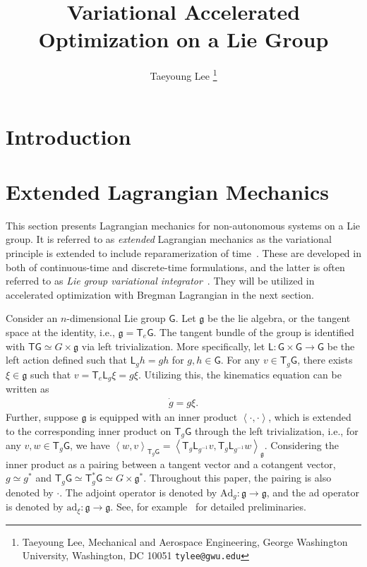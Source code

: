 \documentclass[letterpaper, 10pt, conference]{ieeeconf}
\title{\LARGE \bf Variational Accelerated Optimization on a Lie Group}
\author{Taeyoung Lee%
    \thanks{Taeyoung Lee, Mechanical and Aerospace Engineering, George Washington University, Washington, DC 10051 {\tt tylee@gwu.edu}}%
}
\newcommand{\G}{\ensuremath{\mathsf{G}}}
\newcommand{\T}{\ensuremath{\mathsf{T}}}
\renewcommand{\L}{\ensuremath{\mathsf{L}}}
\newcommand{\pair}[1]{\ensuremath{\left\langle #1 \right\rangle}}
\newcommand{\Ad}{\ensuremath{\mathrm{Ad}}}
\newcommand{\ad}{\ensuremath{\mathrm{ad}}}
\newcommand{\g}{\ensuremath{\mathfrak{g}}}
\begin{document}
\allowdisplaybreaks


\maketitle \thispagestyle{empty} \pagestyle{empty}

\begin{abstract}
\end{abstract}

\section{Introduction}

\section{Extended Lagrangian Mechanics}

This section presents Lagrangian mechanics for non-autonomous systems on a Lie group. 
It is referred to as \textit{extended} Lagrangian mechanics as the variational principle is extended to include reparamerization of time~\cite{MarWesAN01}.
These are developed in both of continuous-time and discrete-time formulations, and the latter is often referred to as \textit{Lie group variational integrator}~\cite{LeeLeoCMAME07}.
They will be utilized in accelerated optimization with Bregman Lagrangian in the next section.

Consider  an $n$-dimensional Lie group $\G$.
Let $\g$ be the lie algebra, or the tangent space at the identity, i.e., $\g = \T_e\G$.
The tangent bundle of the group is identified with $\T\G \simeq G\times \g$ via left trivialization.
More specifically, let $\L:\G\times\G\rightarrow\G$ be the left action defined such that $\L_g h = gh$ for $g,h\in\G$.
For any $v\in\T_g\G$, there exists $\xi\in\g$ such that $v =\T_e\L_g \xi=g\xi$.
Utilizing this, the kinematics equation can be written as
\begin{align}
    \dot g = g\xi. \label{eqn:g_dot}
\end{align}
Further, suppose $\g$ is equipped with an inner product $\pair{\cdot, \cdot}$, which is extended to the corresponding inner product on $\T_g\G$ through the left trivialization, i.e., for any $v,w\in\T_g\G$, we have $\pair{w,v}_{\T_g\G} = \pair{ \T_g \L_{g^{-1}} v, \T_g \L_{g^{-1}} w}_\g$. 
Considering the inner product as a pairing between a tangent vector and a cotangent vector, $g\simeq g^*$ and $\T_g \G \simeq \T^*_g \G\simeq G\times \g^*$.
Throughout this paper, the pairing is also denoted by $\cdot$.
The adjoint operator is denoted by $\Ad_g:\g\rightarrow\g$, and the ad operator is denoted by $\ad_\xi:\g\rightarrow\g$. See, for example~\cite{MarRat99} for detailed preliminaries. 
\end{document}
